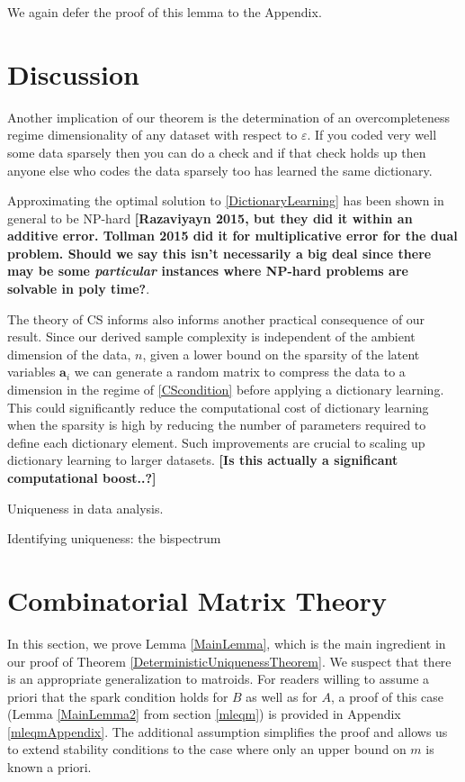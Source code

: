 \documentclass[journal, onecolumn]{IEEEtran}
\begin{document}
We again defer the proof of this lemma to the Appendix.


\section{Discussion}


Another implication of our theorem is the determination of an overcompleteness regime dimensionality of any dataset with respect to $\varepsilon$. If you coded very well some data sparsely then you can do a check and if that check holds up then anyone else who codes the data sparsely too has learned the same dictionary. 

Approximating the optimal solution to \eqref{DictionaryLearning} has been shown in general to be NP-hard \cite{Razaviyayn} \textbf{[Razaviyayn 2015, but they did it within an additive error. Tollman 2015 did it for multiplicative error for the dual problem. Should we say this isn't necessarily a big deal since there may be some \emph{particular} instances where NP-hard problems are solvable in poly time?}. 

The theory of CS informs also informs another practical consequence of our result. Since our derived sample complexity is independent of the ambient dimension of the data, $n$, given a lower bound on the sparsity of the latent variables $\mathbf{a}_i$ we can generate a random matrix to compress the data to a dimension in the regime of \eqref{CScondition} before applying a dictionary learning. This could significantly reduce the computational cost of dictionary learning when the sparsity is high by reducing the number of parameters required to define each dictionary element. Such improvements are crucial to scaling up dictionary learning to larger datasets. \textbf{[Is this actually a significant computational boost..?]}

Uniqueness in data analysis.


Identifying uniqueness: the bispectrum


\appendices
\section{Combinatorial Matrix Theory}

In this section, we prove Lemma \ref{MainLemma}, which is the main ingredient in our proof of Theorem \ref{DeterministicUniquenessTheorem}. We suspect that there is an appropriate generalization to matroids. For readers willing to assume a priori that the spark condition holds for $B$ as well as for $A$, a proof of this case (Lemma \ref{MainLemma2} from section \ref{mleqm}) is provided in Appendix \ref{mleqmAppendix}. The additional assumption simplifies the proof and allows us to extend stability conditions to the case where only an upper bound on $m$ is known a priori. 
\end{document}
